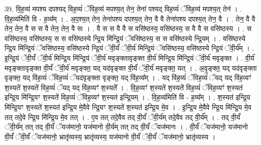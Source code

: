 \documentclass[17pt]{extarticle}
\begin{document}
39. वि॒ह॒व्य॑ मपश्य दपश्यद् विह॒व्यं॑ ॅविह॒व्य॑ मपश्य॒त् तेन॒ तेना॑ पश्यद् विह॒व्यं॑ ॅविह॒व्य॑ मपश्य॒त् तेन॑ । . वि॒ह॒व्य॑मिति॑ वि - ह॒व्य᳚म् । . अ॒प॒श्य॒त् तेन॒ तेना॑पश्य दपश्य॒त् तेन॒ वै वै तेना॑पश्य दपश्य॒त् तेन॒ वै । . तेन॒ वै वै तेन॒ तेन॒ वै स स वै तेन॒ तेन॒ वै सः । . वै स स वै वै स वसि॑ष्ठस्य॒ वसि॑ष्ठस्य॒ स वै वै स वसि॑ष्ठस्य । . स वसि॑ष्ठस्य॒ वसि॑ष्ठस्य॒ स स वसि॑ष्ठस्ये न्द्रि॒य मि॑न्द्रि॒यं ॅवसि॑ष्ठस्य॒ स स वसि॑ष्ठस्ये न्द्रि॒यम् । . वसि॑ष्ठस्ये न्द्रि॒य मि॑न्द्रि॒यं ॅवसि॑ष्ठस्य॒ वसि॑ष्ठस्ये न्द्रि॒यं ॅवी॒र्यं॑ ॅवी॒र्य॑ मिन्द्रि॒यं ॅवसि॑ष्ठस्य॒ वसि॑ष्ठस्ये न्द्रि॒यं ॅवी॒र्य᳚म् । . इ॒न्द्रि॒यं ॅवी॒र्यं॑ ॅवी॒र्य॑ मिन्द्रि॒य मि॑न्द्रि॒यं ॅवी॒र्य॑ मवृङ्क्तावृङ्क्त वी॒र्य॑ मिन्द्रि॒य मि॑न्द्रि॒यं ॅवी॒र्य॑ मवृङ्क्त । . वी॒र्य॑ मवृङ्क्तावृङ्क्त वी॒र्यं॑ ॅवी॒र्य॑ मवृङ्क्त॒ यद् यद॑वृङ्क्त वी॒र्यं॑ ॅवी॒र्य॑ मवृङ्क्त॒ यत् । . अ॒वृ॒ङ्क्त॒ यद् यद॑वृङ्क्ता वृङ्क्त॒ यद् वि॑ह॒व्यं॑ ॅविह॒व्यं॑ ॅयद॑वृङ्क्ता वृङ्क्त॒ यद् वि॑ह॒व्य᳚म् । . यद् वि॑ह॒व्यं॑ ॅविह॒व्यं॑ ॅयद् यद् वि॑ह॒व्यꣳ॑ श॒स्यते॑ श॒स्यते॑ विह॒व्यं॑ ॅयद् यद् वि॑ह॒व्यꣳ॑ श॒स्यते᳚ । . वि॒ह॒व्यꣳ॑ श॒स्यते॑ श॒स्यते॑ विह॒व्यं॑ ॅविह॒व्यꣳ॑ श॒स्यत॑ इन्द्रि॒य मि॑न्द्रि॒यꣳ श॒स्यते॑ विह॒व्यं॑ ॅविह॒व्यꣳ॑ श॒स्यत॑ इन्द्रि॒यम् । . वि॒ह॒व्य॑मिति॑ वि - ह॒व्य᳚म् । . श॒स्यत॑ इन्द्रि॒य मि॑न्द्रि॒यꣳ श॒स्यते॑ श॒स्यत॑ इन्द्रि॒य मे॒वैवे न्द्रि॒यꣳ श॒स्यते॑ श॒स्यत॑ इन्द्रि॒य मे॒व । . इ॒न्द्रि॒य मे॒वैवे न्द्रि॒य मि॑न्द्रि॒य मे॒व तत् तदे॒वे न्द्रि॒य मि॑न्द्रि॒य मे॒व तत् । . ए॒व तत् तदे॒वैव तद् वी॒र्यं॑ ॅवी॒र्य॑म् तदे॒वैव तद् वी॒र्य᳚म् । . तद् वी॒र्यं॑ ॅवी॒र्य॑म् तत् तद् वी॒र्यं॑ ॅयज॑मानो॒ यज॑मानो वी॒र्य॑म् तत् तद् वी॒र्यं॑ ॅयज॑मानः । . वी॒र्यं॑ ॅयज॑मानो॒ यज॑मानो वी॒र्यं॑ ॅवी॒र्यं॑ ॅयज॑मानो॒ भ्रातृ॑व्यस्य॒ भ्रातृ॑व्यस्य॒ यज॑मानो वी॒र्यं॑ ॅवी॒र्यं॑ ॅयज॑मानो॒ भ्रातृ॑व्यस्य । \newline
\end{document}
